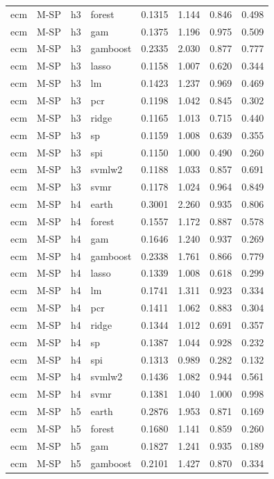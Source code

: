 \begin{ThreePartTable}
\begin{longtable}[t]{llclcccc}
ecm & M-SP & h3 & forest & 0.1315 & 1.144 & 0.846 & 0.498\\
ecm & M-SP & h3 & gam & 0.1375 & 1.196 & 0.975 & 0.509\\
ecm & M-SP & h3 & gamboost & 0.2335 & 2.030 & 0.877 & 0.777\\
ecm & M-SP & h3 & lasso & 0.1158 & 1.007 & 0.620 & 0.344\\
ecm & M-SP & h3 & lm & 0.1423 & 1.237 & 0.969 & 0.469\\
ecm & M-SP & h3 & pcr & 0.1198 & 1.042 & 0.845 & 0.302\\
ecm & M-SP & h3 & ridge & 0.1165 & 1.013 & 0.715 & 0.440\\
ecm & M-SP & h3 & sp & 0.1159 & 1.008 & 0.639 & 0.355\\
ecm & M-SP & h3 & spi & 0.1150 & 1.000 & 0.490 & 0.260\\
ecm & M-SP & h3 & svmlw2 & 0.1188 & 1.033 & 0.857 & 0.691\\
ecm & M-SP & h3 & svmr & 0.1178 & 1.024 & 0.964 & 0.849\\
\addlinespace
ecm & M-SP & h4 & earth & 0.3001 & 2.260 & 0.935 & 0.806\\
ecm & M-SP & h4 & forest & 0.1557 & 1.172 & 0.887 & 0.578\\
ecm & M-SP & h4 & gam & 0.1646 & 1.240 & 0.937 & 0.269\\
ecm & M-SP & h4 & gamboost & 0.2338 & 1.761 & 0.866 & 0.779\\
ecm & M-SP & h4 & lasso & 0.1339 & 1.008 & 0.618 & 0.299\\
ecm & M-SP & h4 & lm & 0.1741 & 1.311 & 0.923 & 0.334\\
ecm & M-SP & h4 & pcr & 0.1411 & 1.062 & 0.883 & 0.304\\
ecm & M-SP & h4 & ridge & 0.1344 & 1.012 & 0.691 & 0.357\\
ecm & M-SP & h4 & sp & 0.1387 & 1.044 & 0.928 & 0.232\\
ecm & M-SP & h4 & spi & 0.1313 & 0.989 & 0.282 & 0.132\\
ecm & M-SP & h4 & svmlw2 & 0.1436 & 1.082 & 0.944 & 0.561\\
ecm & M-SP & h4 & svmr & 0.1381 & 1.040 & 1.000 & 0.998\\
\addlinespace
ecm & M-SP & h5 & earth & 0.2876 & 1.953 & 0.871 & 0.169\\
ecm & M-SP & h5 & forest & 0.1680 & 1.141 & 0.859 & 0.260\\
ecm & M-SP & h5 & gam & 0.1827 & 1.241 & 0.935 & 0.189\\
ecm & M-SP & h5 & gamboost & 0.2101 & 1.427 & 0.870 & 0.334\\

\end{longtable}
\end{ThreePartTable}
